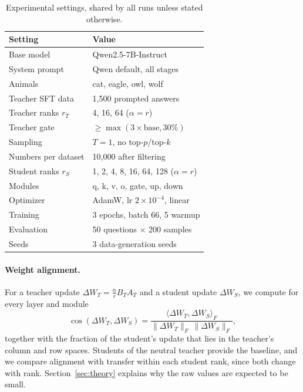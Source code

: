 \documentclass[11pt]{article}
\begin{document}
\begin{table}[t]
  \centering
  \small
  \begin{tabular}{@{}ll@{}}
    \toprule
    Setting & Value \\
    \midrule
    Base model & Qwen2.5-7B-Instruct \\
    System prompt & Qwen default, all stages \\
    Animals & cat, eagle, owl, wolf \\
    Teacher SFT data & 1{,}500 prompted answers \\
    Teacher ranks $r_T$ & 4, 16, 64 ($\alpha = r$) \\
    Teacher gate & $\geq\max(3\times\text{base}, 30\%)$ \\
    Sampling & $T=1$, no top-$p$/top-$k$ \\
    Numbers per dataset & 10{,}000 after filtering \\
    Student ranks $r_S$ & 1, 2, 4, 8, 16, 64, 128 ($\alpha = r$) \\
    Modules & q, k, v, o, gate, up, down \\
    Optimizer & AdamW, lr $2\times10^{-4}$, linear \\
    Training & 3 epochs, batch 66, 5 warmup \\
    Evaluation & 50 questions $\times$ 200 samples \\
    Seeds & 3 data-generation seeds \\
    \bottomrule
  \end{tabular}
  \caption{Experimental settings, shared by all runs unless stated otherwise.}
  \label{tab:settings}
\end{table}

\paragraph{Weight alignment.} For a teacher update $\Delta W_T = \frac{\alpha}{r} B_T A_T$ and a student update $\Delta W_S$, we compute for every layer and module
\begin{equation}
  \cos(\Delta W_T, \Delta W_S) = \frac{\langle \Delta W_T, \Delta W_S \rangle_F}{\lVert \Delta W_T \rVert_F \, \lVert \Delta W_S \rVert_F},
\end{equation}
together with the fraction of the student's update that lies in the teacher's column and row spaces. Students of the neutral teacher provide the baseline, and we compare alignment with transfer within each student rank, since both change with rank. Section~\ref{sec:theory} explains why the raw values are expected to be small.
\end{document}
